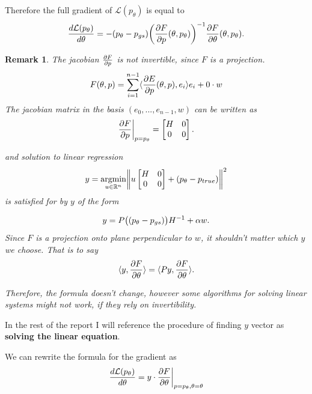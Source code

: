 \documentclass[a4paper,10pt]{report}
\newtheorem{remark}{Remark}
\begin{document}
Therefore the full gradient of $\mathcal{L}(p_\theta)$ is equal to
\begin{equation}
 \frac{d\mathcal{L}(p_\theta)}{d \theta} = - (p_\theta - p_{gs})\bigg(\frac{\partial F}{\partial p}(\theta,p_\theta)\bigg)^{-1} \frac{\partial F}{\partial \theta}(\theta,p_\theta).
\end{equation}
 \begin{remark}
 The jacobian $\frac{\partial F}{\partial p}$ is not invertible, since $F$ is a projection.
  \begin{equation}
   F(\theta, p) = \sum_{i=1}^{n-1} \langle \frac{\partial E}{\partial p}(\theta, p), e_i \rangle e_i +  0 \cdot w
  \end{equation}
%
 The jacobian matrix in the basis $(e_0,...,e_{n-1},w)$ can be written as \begin{equation}
                      \frac{\partial F}{\partial p}\bigg|_{p=p_\theta} =\begin{bmatrix}
H & 0 \\
0 & 0
\end{bmatrix}.
\end{equation}

and solution to linear regression
\begin{equation}
 y = \underset{u\in \mathbb{R}^n}{\mathrm{argmin }}\bigg\|u \begin{bmatrix}
H & 0 \\
0 & 0
\end{bmatrix} + (p_\theta-p_{true})\bigg\|^2
\end{equation}
is satisfied for by $y$ of the form

\begin{equation}
 y = P\big((p_\theta-p_{gs})\big)H^{-1} + \alpha w.
\end{equation}
Since $F$ is a projection onto plane perpendicular to $w$, it shouldn't matter which $y$ we choose.
That is to say
\begin{equation}
 \langle y,  \frac{\partial F}{\partial \theta} \rangle=\langle Py, \frac{\partial F}{\partial \theta} \rangle.
\end{equation}



Therefore, the formula doesn't change, however some algorithms for solving linear systems might not work, if they rely on invertibility.

\end{remark}
In the rest of the report I will reference the procedure of finding $y$ vector as \textbf{solving the linear equation}.


We can rewrite the formula for the gradient as
\begin{equation}
 \frac{d\mathcal{L}(p_\theta)}{d \theta} = y \cdot  \frac{\partial F}{\partial \theta}\bigg|_{p=p_\theta, \theta=\theta}
\end{equation}
\end{document}
